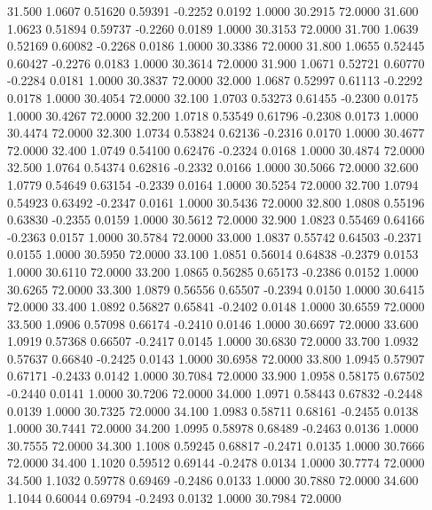   31.500   1.0607   0.51620   0.59391  -0.2252   0.0192   1.0000  30.2915  72.0000
  31.600   1.0623   0.51894   0.59737  -0.2260   0.0189   1.0000  30.3153  72.0000
  31.700   1.0639   0.52169   0.60082  -0.2268   0.0186   1.0000  30.3386  72.0000
  31.800   1.0655   0.52445   0.60427  -0.2276   0.0183   1.0000  30.3614  72.0000
  31.900   1.0671   0.52721   0.60770  -0.2284   0.0181   1.0000  30.3837  72.0000
  32.000   1.0687   0.52997   0.61113  -0.2292   0.0178   1.0000  30.4054  72.0000
  32.100   1.0703   0.53273   0.61455  -0.2300   0.0175   1.0000  30.4267  72.0000
  32.200   1.0718   0.53549   0.61796  -0.2308   0.0173   1.0000  30.4474  72.0000
  32.300   1.0734   0.53824   0.62136  -0.2316   0.0170   1.0000  30.4677  72.0000
  32.400   1.0749   0.54100   0.62476  -0.2324   0.0168   1.0000  30.4874  72.0000
  32.500   1.0764   0.54374   0.62816  -0.2332   0.0166   1.0000  30.5066  72.0000
  32.600   1.0779   0.54649   0.63154  -0.2339   0.0164   1.0000  30.5254  72.0000
  32.700   1.0794   0.54923   0.63492  -0.2347   0.0161   1.0000  30.5436  72.0000
  32.800   1.0808   0.55196   0.63830  -0.2355   0.0159   1.0000  30.5612  72.0000
  32.900   1.0823   0.55469   0.64166  -0.2363   0.0157   1.0000  30.5784  72.0000
  33.000   1.0837   0.55742   0.64503  -0.2371   0.0155   1.0000  30.5950  72.0000
  33.100   1.0851   0.56014   0.64838  -0.2379   0.0153   1.0000  30.6110  72.0000
  33.200   1.0865   0.56285   0.65173  -0.2386   0.0152   1.0000  30.6265  72.0000
  33.300   1.0879   0.56556   0.65507  -0.2394   0.0150   1.0000  30.6415  72.0000
  33.400   1.0892   0.56827   0.65841  -0.2402   0.0148   1.0000  30.6559  72.0000
  33.500   1.0906   0.57098   0.66174  -0.2410   0.0146   1.0000  30.6697  72.0000
  33.600   1.0919   0.57368   0.66507  -0.2417   0.0145   1.0000  30.6830  72.0000
  33.700   1.0932   0.57637   0.66840  -0.2425   0.0143   1.0000  30.6958  72.0000
  33.800   1.0945   0.57907   0.67171  -0.2433   0.0142   1.0000  30.7084  72.0000
  33.900   1.0958   0.58175   0.67502  -0.2440   0.0141   1.0000  30.7206  72.0000
  34.000   1.0971   0.58443   0.67832  -0.2448   0.0139   1.0000  30.7325  72.0000
  34.100   1.0983   0.58711   0.68161  -0.2455   0.0138   1.0000  30.7441  72.0000
  34.200   1.0995   0.58978   0.68489  -0.2463   0.0136   1.0000  30.7555  72.0000
  34.300   1.1008   0.59245   0.68817  -0.2471   0.0135   1.0000  30.7666  72.0000
  34.400   1.1020   0.59512   0.69144  -0.2478   0.0134   1.0000  30.7774  72.0000
  34.500   1.1032   0.59778   0.69469  -0.2486   0.0133   1.0000  30.7880  72.0000
  34.600   1.1044   0.60044   0.69794  -0.2493   0.0132   1.0000  30.7984  72.0000
